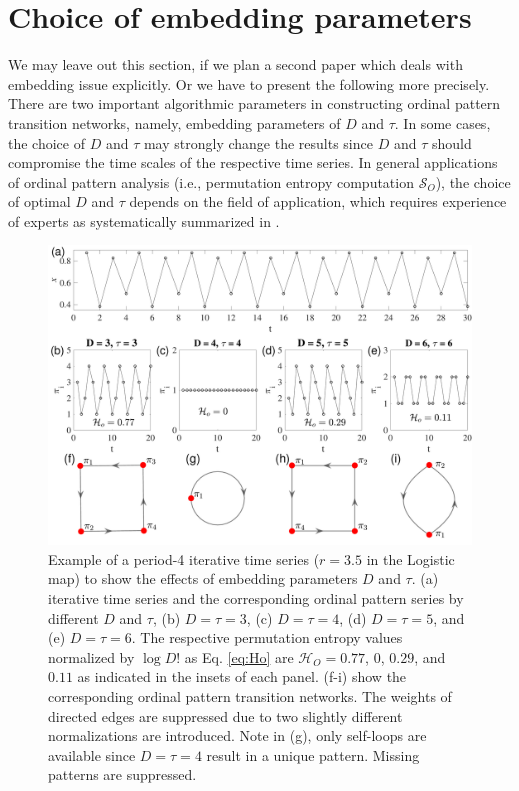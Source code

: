 \documentclass[12pt,aip,cha,reprint,nofootinbib]{revtex4-1}
\begin{document}
\section{Choice of embedding parameters} \label{sec:embeddings}
{\color{red}We may leave out this section, if we plan a second paper which deals with embedding issue explicitly. Or we have to present the following more precisely. }
There are two important algorithmic parameters in constructing ordinal pattern transition networks, namely, embedding parameters of $D$ and $\tau$. In some cases, the choice of $D$ and $\tau$ may strongly change the results since $D$ and $\tau$ should compromise the time scales of the respective time series. In general applications of ordinal pattern analysis (i.e., permutation entropy computation $\mathcal{S}_O$), the choice of optimal $D$ and $\tau$ depends on the field of application, which requires experience of experts as systematically summarized in \cite{Riedl2013}.
\begin{figure}
	\centering 
	\includegraphics[width=2\columnwidth]{period4_logisticExample.pdf}
\caption{\small{Example of a period-4 iterative time series ($r= 3.5$ in the Logistic map) to show the effects of embedding parameters $D$ and $\tau$. (a) iterative time series and the corresponding ordinal pattern series by different $D$ and $\tau$, (b) $D = \tau = 3$, (c) $D = \tau = 4$, (d) $D = \tau = 5$, and (e) $D = \tau = 6$. The respective permutation entropy values normalized by $\log D!$ as Eq. \eqref{eq:Ho} are $\mathcal{H}_O = 0.77$, $0$, $0.29$, and $0.11$ as indicated in the insets of each panel. (f-i) show the corresponding ordinal pattern transition networks. The weights of directed edges are suppressed due to two slightly different normalizations are introduced. Note in (g), only self-loops are available since $D = \tau = 4$ result in a unique pattern. Missing patterns are suppressed. }
\label{fig:embed}}
\end{figure}
\end{document}
